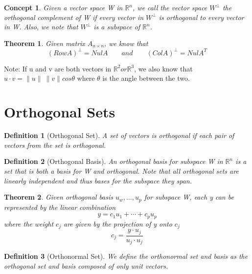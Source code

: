 \documentclass[12pt]{report}
\newtheorem{thm}{Theorem}
\newtheorem{dfn}{Definition}
\newtheorem{cpt}{Concept}
\newcommand{\mtx}[3]{$#1_{#2\times #3}$}
\begin{document}
\begin{cpt}
Given a vector space W in $\mathbb{R}^n$, we call the vector space $W^\perp$ the orthogonal complement of W if every vector in $W^\perp$ is orthogonal to every vector in W. Also, we note that $W^\perp$ is a subspace of $\mathbb{R}^n$.
\end{cpt}

\begin{thm}
Given matrix \mtx{A}{n}{n}, we know that
\begin{equation}
(Row A)^\perp = Nul A \qquad and \qquad (Col A)^\perp = Nul A^T
\end{equation}
\end{thm}

Note: If u and v are both vectors in $\mathbb{R}^2 or \mathbb{R}^3$, we also know that $u \cdot v = \|u\| \: \|v\|cos \theta$ where $\theta$ is the angle between the two.

\section{Orthogonal Sets}

\begin{dfn}[Orthogonal Set]
A set of vectors is orthogonal if each pair of vectors from the set is orthogonal.
\end{dfn}

\begin{dfn}[Orthogonal Basis]
An orthogonal basis for subspace W in $\mathbb{R}^n$ is a set that is both a basis for W and orthogonal. Note that all orthogonal sets are linearly independent and thus bases for the subspace they span.
\end{dfn}

\begin{thm}
Given orthogonal basis ${u_w, \ldots, u_p}$ for subspace W, each y can be represented by the linear combination
\begin{equation}
y = c_1u_1+\cdots+c_pu_p
\end{equation}
where the weight $c_j$ are given by the projection of y onto $c_j$
\begin{equation}
c_j=\frac{y\cdot u_j}{u_j\cdot u_j}
\end{equation}
\end{thm}

\begin{dfn}[Orthonormal Set]
We define the orthonormal set and basis as the orthogonal set and basis composed of only unit vectors.
\end{dfn}
\end{document}
